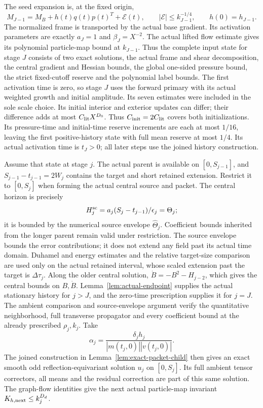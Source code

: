 \documentclass[11pt]{article}
\theoremstyle{definition}
\begin{document}
The seed expansion is, at the fixed origin,
\[
 M_{J-1}=M_B+h(t)q(t)p(t)^T+\mathcal E(t),\qquad
 |\mathcal E|\leq k_{J-1}^{-1/4},\qquad h(0)=h_{J-1}.
\]
The normalized frame is transported by the actual base gradient.
Its activation parameters are exactly $a_J=1$ and $\beta_J=X^{-2}$.
The actual lifted flow estimate gives its polynomial particle-map
bound at $k_{J-1}$. Thus the complete input state for stage $J$ consists
of two exact solutions, the actual frame and shear decomposition,
the central gradient and Hessian bounds, the global one-sided pressure bound,
the strict fixed-cutoff reserve and the polynomial label bounds.
The first activation time is zero, so stage $J$ uses the forward primary
with its actual weighted growth and initial amplitude. Its seven estimates
were included in the sole scale choice. Its initial interior and exterior
updates can differ; their difference adds at most
$C_{\rm lit}X^{D_0}$. Thus $C_{\rm init}=2C_{\rm lit}$ covers both
initializations. Its pressure-time and initial-time reserve increments
are each at most $1/16$, leaving the first positive-history state with
full mean reserve at most $1/4$. Its actual activation time is $t_J>0$;
all later steps use the joined history construction.

Assume that state at stage $j$. The actual parent is available on
$[0,S_{j-1}]$, and $S_{j-1}-t_{j-1}=2W_j$ contains the target and
short retained extension. Restrict it to $[0,S_j]$ when forming the
actual central source and packet. The central horizon is precisely
\[
 H_j^{\rm sc}=a_j(S_j-t_{j-1})/\epsilon_j=\Theta_j;
\]
it is bounded by the numerical source envelope $\widehat\Theta_j$.
Coefficient bounds inherited from the longer parent remain valid under
restriction. The source envelope bounds the error contributions; it does
not extend any field past its actual time domain. Duhamel and energy
estimates and the relative target-size comparison are used only on the
actual retained interval, whose scaled extension past the target is
$\Delta\tau_j$. Along the older central solution,
$\dot B=-B^2-H_{j-2}$, which gives the central bounds on $B,\dot B$.
Lemma~\ref{lem:actual-endpoint} supplies the actual stationary history
for $j>J$, and the zero-time prescription supplies it for $j=J$.
The ambient comparison and source-envelope argument verify the
quantitative neighborhood, full transverse propagator and every
coefficient bound at the already prescribed $\rho_j,k_j$.
Take
\[
 \alpha_j=\frac{\delta_jh_j}{|m(t_j,0)||v(t_j,0)|}.
\]
The joined construction in Lemma~\ref{lem:exact-packet-child} then gives
an exact smooth odd reflection-equivariant solution $u_j$ on $[0,S_j]$.
Its full ambient tensor correctors, all means and the residual correction
are part of this same solution. The graph-flow identities give the
next actual particle-map invariant $K_{h,\rm next}\leq k_j^{D_d}$.
\end{document}

